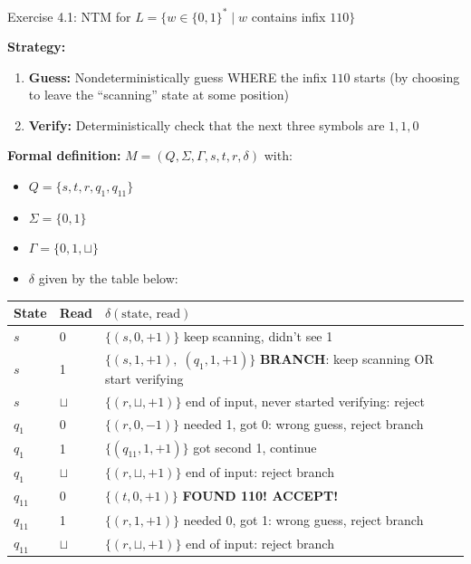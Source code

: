 \documentclass[11pt,a4paper]{article}
\begin{document}
\begin{examplebox}{{Exercise 4.1: NTM for $L = \{w \in \{0,1\}^* \mid w$ contains infix $110\}$}}

\textbf{Strategy:}
\begin{enumerate}[nosep]
\item \textbf{Guess:} Nondeterministically guess WHERE the infix $110$ starts (by choosing to leave the ``scanning'' state at some position)
\item \textbf{Verify:} Deterministically check that the next three symbols are $1, 1, 0$
\end{enumerate}

\textbf{Formal definition:} $M = (Q, \Sigma, \Gamma, s, t, r, \delta)$ with:
\begin{itemize}[nosep]
\item $Q = \{s, t, r, q_1, q_{11}\}$
\item $\Sigma = \{0, 1\}$
\item $\Gamma = \{0, 1, \sqcup\}$
\item $\delta$ given by the table below:
\end{itemize}

\begin{center}
\renewcommand{\arraystretch}{1.3}
\begin{tabular}{llp{7cm}}
\toprule
State & Read & $\delta(\text{state, read})$ \\
\midrule
$s$ & 0 & $\{(s, 0, +1)\}$ \quad keep scanning, didn't see 1 \\
$s$ & 1 & $\{(s, 1, +1),\; (q_1, 1, +1)\}$ \quad \textbf{BRANCH}: keep scanning OR start verifying \\
$s$ & $\sqcup$ & $\{(r, \sqcup, +1)\}$ \quad end of input, never started verifying: reject \\
\midrule
$q_1$ & 0 & $\{(r, 0, -1)\}$ \quad needed 1, got 0: wrong guess, reject branch \\
$q_1$ & 1 & $\{(q_{11}, 1, +1)\}$ \quad got second 1, continue \\
$q_1$ & $\sqcup$ & $\{(r, \sqcup, +1)\}$ \quad end of input: reject branch \\
\midrule
$q_{11}$ & 0 & $\{(t, 0, +1)\}$ \quad \textbf{FOUND 110! ACCEPT!} \\
$q_{11}$ & 1 & $\{(r, 1, +1)\}$ \quad needed 0, got 1: wrong guess, reject branch \\
$q_{11}$ & $\sqcup$ & $\{(r, \sqcup, +1)\}$ \quad end of input: reject branch \\
\bottomrule
\end{tabular}
\end{center}


\end{examplebox}
\end{document}
